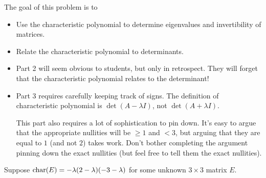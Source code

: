 	\bookonlynewpage
	\question
	\begin{annotation}
		\begin{goals}

			The goal of this problem is to
			\begin{itemize}
				\item Use the characteristic polynomial to determine eigenvalues
					and invertibility of matrices.
				\item Relate the characteristic polynomial to determinants.
			\end{itemize}
		\end{goals}

		\begin{notes}
			\begin{itemize}
				\item Part 2 will seem obvious to students, but only
					in retrospect. They will forget that the characteristic polynomial
					relates to the determinant!
				\item Part 3 requires carefully keeping track of signs. The definition of characteristic
					polynomial is $\det(A-\lambda I)$, not $\det(A+\lambda I)$.

					This part also requires a lot of sophistication to pin down.
					It's easy to argue that the appropriate nullities will be $\geq 1$
					and $<3$, but arguing that they are equal to $1$ (and not $2$) takes work.
					Don't bother completing the argument pinning down the exact nullities 
					(but feel free to tell them the exact nullities).
			\end{itemize}
		\end{notes}
	\end{annotation}
	\vspace{-.2cm}
	Suppose $\operatorname{char}(E)=-\lambda(2-\lambda)(-3-\lambda)$ for some unknown $3\times 3$
	matrix $E$.
